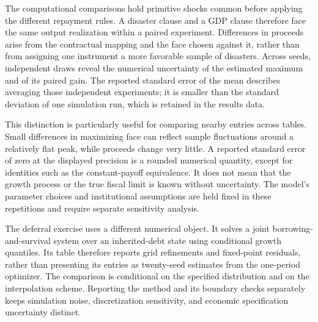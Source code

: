 The computational comparisons hold primitive shocks common before applying the different repayment rules. A disaster clause and a GDP clause therefore face the same output realization within a paired experiment. Differences in proceeds arise from the contractual mapping and the face chosen against it, rather than from assigning one instrument a more favorable sample of disasters. Across seeds, independent draws reveal the numerical uncertainty of the estimated maximum and of its paired gain. The reported standard error of the mean describes averaging those independent experiments; it is smaller than the standard deviation of one simulation run, which is retained in the results data.

This distinction is particularly useful for comparing nearby entries across tables. Small differences in maximizing face can reflect sample fluctuations around a relatively flat peak, while proceeds change very little. A reported standard error of zero at the displayed precision is a rounded numerical quantity, except for identities such as the constant-payoff equivalence. It does not mean that the growth process or the true fiscal limit is known without uncertainty. The model's parameter choices and institutional assumptions are held fixed in these repetitions and require separate sensitivity analysis.

The deferral exercise uses a different numerical object. It solves a joint borrowing-and-survival system over an inherited-debt state using conditional growth quantiles. Its table therefore reports grid refinements and fixed-point residuals, rather than presenting its entries as twenty-seed estimates from the one-period optimizer. The comparison is conditional on the specified distribution and on the interpolation scheme. Reporting the method and its boundary checks separately keeps simulation noise, discretization sensitivity, and economic specification uncertainty distinct.
